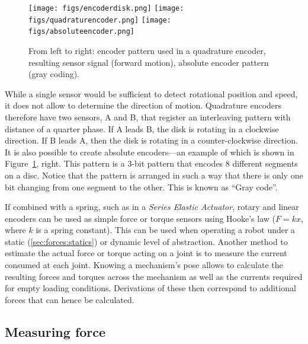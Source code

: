 \begin{figure}
	\centering
		\texttt{[image: figs/encoderdisk.png]}
		\texttt{[image: figs/quadraturencoder.png]}
		\texttt{[image: figs/absoluteencoder.png]}
	\caption{From left to right: encoder pattern used in a quadrature encoder, resulting sensor signal (forward motion), absolute encoder pattern (gray coding).}
	\label{fig:encoders}
\end{figure}

While a single sensor would be sufficient to detect rotational position and speed, it does not allow to determine the direction of motion. Quadrature encoders therefore have two sensors, A and B, that register an interleaving pattern with distance of a quarter phase. If A leads B, the disk is rotating in a clockwise direction. If B leads A, then the disk is rotating in a counter-clockwise direction. It is also possible to create absolute encoders---an example of which is shown in Figure~\ref{fig:encoders}, right. This pattern is a 3-bit pattern that encodes 8 different segments on a disc. Notice that the pattern is arranged in such a way that there is only one bit changing from one segment to the other. This is known as ``Gray code''.

If combined with a spring, such as in a \textsl{Series Elastic Actuator}, rotary and linear encoders can be used as simple force or torque sensors using Hooke's law ($F=kx$, where $k$ is a spring constant).
This can be used when operating a robot under a static (\cref{sec:forces:statics}) or dynamic level of abstraction.
Another method to estimate the actual force or torque acting on a joint is to measure the current consumed at each joint. Knowing a mechanism's pose allows to calculate the resulting forces and torques across the mechanism as well as the currents required for empty loading conditions. Derivations of these then correspond to additional forces that can hence be calculated.

\subsection{Measuring force}

